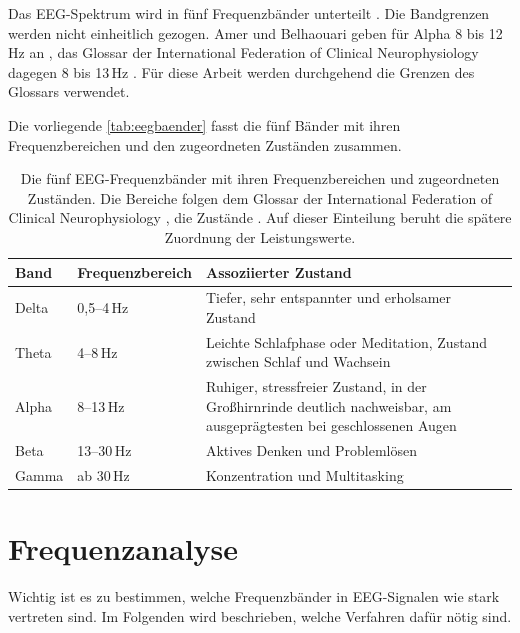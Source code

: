 \vspace{\baselineskip}

\noindent Das \ac{EEG}-Spektrum wird in fünf Frequenzbänder unterteilt \autocite{10353995}.
Die Bandgrenzen werden nicht einheitlich gezogen. Amer und Belhaouari geben für Alpha 8 bis 12\,Hz an \autocite{10353995}, das Glossar der International Federation of Clinical Neurophysiology dagegen 8 bis 13\,Hz \autocite{ifcn_glossary2017,ifcn_glossary2019}. Für diese Arbeit werden durchgehend die Grenzen des Glossars verwendet.
\vspace{\baselineskip}
\newpage

\noindent Die vorliegende \autoref{tab:eegbaender} fasst die fünf Bänder mit ihren Frequenzbereichen und den zugeordneten Zuständen zusammen.

\begin{table}[H]
\centering
\caption[EEG-Frequenzbänder]{Die fünf EEG-Frequenzbänder mit ihren Frequenzbereichen und zugeordneten Zuständen. Die Bereiche folgen dem Glossar der International Federation of Clinical Neurophysiology \autocite{ifcn_glossary2017,ifcn_glossary2019}, die Zustände \autocite{10353995}. Auf dieser Einteilung beruht die spätere Zuordnung der Leistungswerte.}
\label{tab:eegbaender}
\begin{tabularx}{\textwidth}{l l X}
\toprule
\textbf{Band} & \textbf{Frequenzbereich} & \textbf{Assoziierter Zustand} \\
\midrule
Delta & 0,5--4\,Hz  & Tiefer, sehr entspannter und erholsamer Zustand \\
Theta & 4--8\,Hz    & Leichte Schlafphase oder Meditation, Zustand zwischen Schlaf und Wachsein \\
Alpha & 8--13\,Hz   & Ruhiger, stressfreier Zustand, in der Großhirnrinde deutlich nachweisbar, am ausgeprägtesten bei geschlossenen Augen \\
Beta  & 13--30\,Hz  & Aktives Denken und Problemlösen \\
Gamma & ab 30\,Hz   & Konzentration und Multitasking \\
\bottomrule
\end{tabularx}
\end{table}

\section{Frequenzanalyse}
\label{sec:frequenzanalyse}
Wichtig ist es zu bestimmen, welche Frequenzbänder in \ac{EEG}-Signalen wie stark vertreten sind. Im Folgenden wird beschrieben, welche Verfahren dafür nötig sind.

